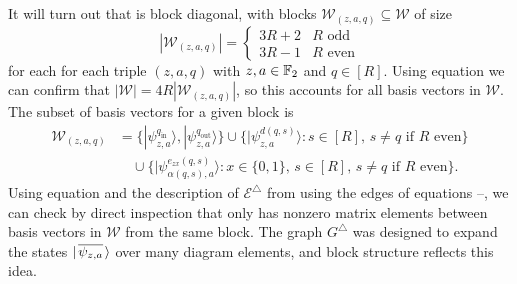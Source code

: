 \documentclass[../thesis-main/thesis-main]{subfiles}
\begin{document}
It will turn out that  is block diagonal, with blocks $\mathcal{W}_{(z,a,q)}\subseteq\mathcal{W}$ of size
\begin{equation}
  \left|\mathcal{W}_{(z,a,q)}\right|=\begin{cases}
    3R+2 & R\text{ odd}\\
    3R-1 & R\text{ even}
  \end{cases}
\end{equation}
for each for each triple $(z,a,q)$ with $z,a\in\mathbb{F}_2$ and $q\in[R]$.  Using equation  we can confirm that $|\mathcal{W}|=4R\left|\mathcal{W}_{(z,a,q)}\right|$, so this accounts for all basis vectors in $\mathcal{W}$. The subset of basis vectors for a given block is
\begin{align}
  \mathcal{W}_{(z,a,q)} 
    &=\big\{ |\psi_{z,a}^{q_{\text{in}}}\rangle,|\psi_{z,a}^{q_{\text{out}}}\rangle\big\} \cup\big\{ |\psi_{z,a}^{d(q,s)}\rangle\colon s\in[R],\, s\neq q\text{ if }R\text{ even}\big\} \nonumber \\
    &\quad \cup \big\{ |\psi_{\alpha(q,s),a}^{e_{zx}(q,s)}\rangle\colon x\in\{0,1\},\, s\in[R],\, s\neq q\text{ if }R\text{ even}\big\} .\label{eq:subset_W}
\end{align}
Using equation  and the description of $\mathcal{E}^{\triangle}$ from using the edges of equations  --, we can check by direct inspection that  only has nonzero matrix elements between basis vectors in $\mathcal{W}$ from the same block.  The graph $G^\triangle$ was designed to expand the states $|\mspace{2mu} \overline{\psi_{z,a}} \mspace{2mu} \rangle$ over many diagram elements, and block structure reflects this idea.
\end{document}

